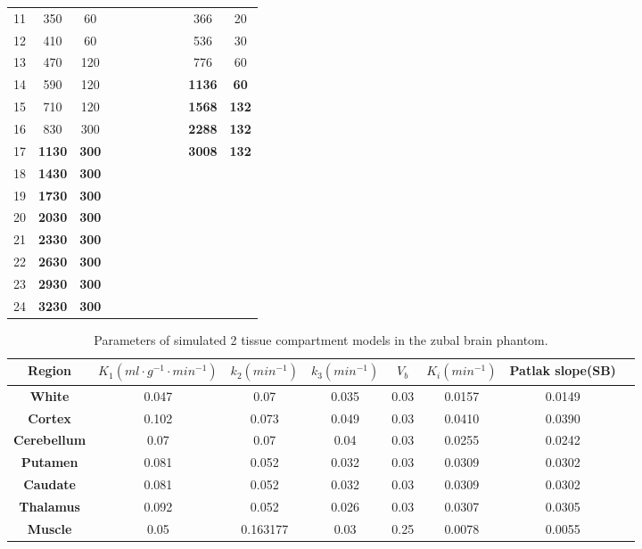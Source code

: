 \begin{table}[htb!]
\begin{tabular}{|c|c|c|c|c|c|c|c|c|c|c|}
11 & 350  & 60  & &  &  &  &  &  & 366  & 20 \\
12 & 410  & 60  & &  &  &  &  &  & 536  & 30 \\
13 & 470  & 120 & &  &  &  &  &  & 776  & 60 \\
14 & 590  & 120 & &  &  &  &  &  & \textbf{1136} & \textbf{60}  \\
15 & 710  & 120 & &  &  &  &  &  & \textbf{1568} & \textbf{132} \\
16 & 830  & 300 & &  &  &  &  &  & \textbf{2288} & \textbf{132} \\
17 & \textbf{1130} & \textbf{300} & &  &  &  &  &  & \textbf{3008} & \textbf{132} \\
18 & \textbf{1430} & \textbf{300} & & & & & & & & \\
19 & \textbf{1730} & \textbf{300} & & & & & & & & \\
20 & \textbf{2030} & \textbf{300} & & & & & & & & \\
21 & \textbf{2330} & \textbf{300} & & & & & & & & \\
22 & \textbf{2630} & \textbf{300} & & & & & & & & \\
23 & \textbf{2930} & \textbf{300} & & & & & & & & \\
24 & \textbf{3230} & \textbf{300} & & & & & & & & \\
\toprule
\end{tabular}
\label{tab:multicol}
\end{table}

\begin{table}[htb!]
\caption{Parameters of simulated 2 tissue compartment models in the zubal brain phantom.}
\label{table:KineticValues}
 \begin{tabular}{c c c c c c c c} 
\toprule
 Region & $K_1 (ml \cdot g^{-1} \cdot min^{-1})$ & $k_2 (min^{-1})$ & $k_3 (min^{-1})$ & $V_b$ & $K_i (min^{-1})$ & Patlak slope(SB) \\ [0.5ex] 
\midrule
\textbf{White}       & 0.047  & 0.07     & 0.035 & 0.03     & 0.0157 & 0.0149 \\
\textbf{Cortex}      & 0.102  & 0.073    & 0.049 & 0.03     & 0.0410 & 0.0390 \\
\textbf{Cerebellum}  & 0.07   & 0.07     & 0.04  & 0.03     & 0.0255 & 0.0242 \\
\textbf{Putamen}     & 0.081  & 0.052    & 0.032 & 0.03     & 0.0309 & 0.0302 \\
\textbf{Caudate}     & 0.081  & 0.052    & 0.032 & 0.03     & 0.0309 & 0.0302 \\
\textbf{Thalamus}    & 0.092  & 0.052    & 0.026 & 0.03     & 0.0307 & 0.0305 \\
\textbf{Muscle}      & 0.05   & 0.163177 & 0.03  & 0.25     & 0.0078 & 0.0055 \\
\toprule
\end{tabular}
\label{tab:multicol2}
\end{table}

